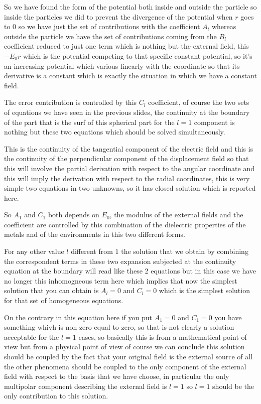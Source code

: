 \documentclass[../main/main.tex]{subfiles}
\begin{document}
So we have found the form of the potential both inside and outside the particle so inside the particles we did to prevent the divergence of the potential when $r$ goes to $0$ so we have just the set of contributions with the coefficient $A_l$ whereas outside the particle we have the set of contributions coming from the $B_l$ coefficient reduced to just one term which is nothing but the external field, this $-E_0 r$ which is the potential competing to that specific constant potential, so it's an increasing potential which various linearly with the coordinate so that its derivative is a constant which is exactly  the situation in which we have a constant field. 

The error contribution is controlled by this $C_l$ coefficient, of course the two sets of equations we have seen in the previous slides, the continuity at the boundary of the part that is the surf of this spherical part for the $l=1$ component is nothing but these two equations which should be solved simultaneously. 

This is the continuity of the tangential component of the electric field and this is the continuity of the perpendicular component of the displacement field so that this will involve the partial derivation with respect to the angular coordinate and this will imply the derivation with respect to the radial coordinates, this is very simple two equations in two unknowns, so it has closed solution which is reported here.

So $A_1$ and $C_1$ both depends on $E_0$, the modulus of the external fields and the coefficient are controlled by this combination of the dielectric properties of the metals and of the environments in this two different forms. 

For any other value $l$ different from $1$ the solution that we obtain by combining the correspondent terms in these two expansion subjected at the continuity equation at the boundary  will read like these 2 equations but in this case we have no longer this inhomogneous term here which implies that now the simplest solution that you can obtain is $A_l = 0$ and $C_l = 0$ which is the simplest solution for that set of homogeneous equations. 

On the contrary in this equation here if you put $A_1=0$ and $C_1=0$ you have something whivh is non zero equal to zero, so that is not clearly a solution acceptable for the $l=1$ cases, so basically this is from a mathematical point of view but from a physical point of view of course we can conclude this solution should be coupled by the fact that your original field is the external source of all the other phenomena should be coupled to the only component of the external field with respect to the basis that we have choose, in particular the only multipolar component describing the external field is $l=1$ so $l=1$ should be the only contribution to this solution.
\end{document}

